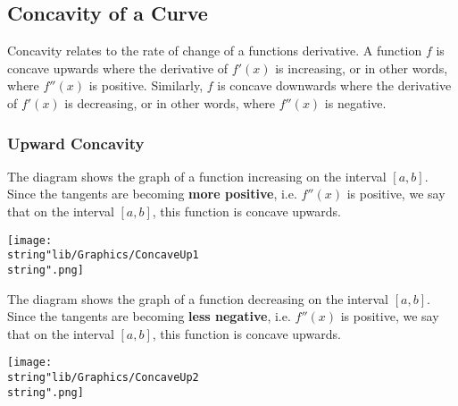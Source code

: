 \documentclass[11pt,a4paper]{book}
\begin{document}
\newpage{}

\subsection{Concavity of a Curve}

Concavity relates to the rate of change of a functions derivative.
A function $f$ is concave upwards where the derivative of $f'(x)$
is increasing, or in other words, where $f''(x)$ is positive. Similarly,
$f$ is concave downwards where the derivative of $f'(x)$ is decreasing,
or in other words, where $f''(x)$ is negative.

\subsubsection{Upward Concavity}

\begin{minipage}[t]{0.6\textwidth}

The diagram shows the graph of a function increasing on the interval
$\left[a,b\right]$. Since the tangents are becoming \textbf{more
positive}, i.e. $f''(x)$ is positive, we say that on the interval
$\left[a,b\right]$, this function is concave upwards.

\end{minipage}
\begin{minipage}[t]{0.4\textwidth}
\begin{center}
\texttt{[image: \\string"lib/Graphics/ConcaveUp1\\string".png]}
\par\end{center}

\end{minipage}

\begin{minipage}[t]{0.6\textwidth}

The diagram shows the graph of a function decreasing on the interval
$\left[a,b\right]$. Since the tangents are becoming \textbf{less
negative}, i.e. $f''(x)$ is positive, we say that on the interval
$\left[a,b\right]$, this function is concave upwards.

\end{minipage}
\begin{minipage}[t]{0.1\textwidth}
\begin{center}
\texttt{[image: \\string"lib/Graphics/ConcaveUp2\\string".png]}
\par\end{center}

\end{minipage}
\end{document}
